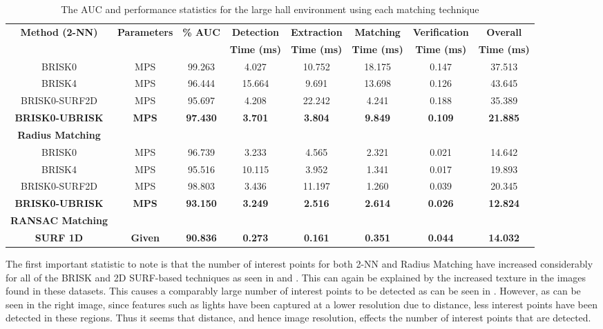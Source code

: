 \begin{table}
\centering
\caption{The AUC and performance statistics for the large hall environment
using each matching technique}

\footnotesize
\begin{tabular}{|c|c|c|c|c|c|c|c|}
\hline 
\textbf{Method (2-NN)} & \textbf{Parameters} & \textbf{\% AUC} & \textbf{Detection} & \textbf{Extraction} & \textbf{Matching} & \textbf{Verification} & \textbf{Overall}\tabularnewline
 &  &  & \textbf{Time (ms)} & \textbf{Time (ms)} & \textbf{Time (ms)} & \textbf{Time (ms)} & \textbf{Time (ms)}\tabularnewline
\hline 
\hline 
BRISK0 & MPS & 99.263 & 4.027 & 10.752 & 18.175 & 0.147 & 37.513\tabularnewline
\hline 
BRISK4 & MPS & 96.444 & 15.664 & 9.691 & 13.698 & 0.126 & 43.645\tabularnewline
\hline 
BRISK0-SURF2D & MPS & 95.697 & 4.208 & 22.242 & 4.241 & 0.188 & 35.389\tabularnewline
\hline 
\textbf{BRISK0-UBRISK} & \textbf{MPS} & \textbf{97.430} & \textbf{3.701} & \textbf{3.804} & \textbf{9.849} & \textbf{0.109} & \textbf{21.885}\tabularnewline
\hline 
\hline 
\textbf{Radius Matching} &  &  &  &  &  &  & \tabularnewline
\hline 
BRISK0 & MPS & 96.739 & 3.233 & 4.565 & 2.321 & 0.021 & 14.642\tabularnewline
\hline 
BRISK4 & MPS & 95.516 & 10.115 & 3.952 & 1.341 & 0.017 & 19.893\tabularnewline
\hline 
BRISK0-SURF2D & MPS & 98.803 & 3.436 & 11.197 & 1.260 & 0.039 & 20.345\tabularnewline
\hline 
\textbf{BRISK0-UBRISK} & \textbf{MPS} & \textbf{93.150} & \textbf{3.249} & \textbf{2.516} & \textbf{2.614} & \textbf{0.026} & \textbf{12.824}\tabularnewline
\hline 
\hline 
\textbf{RANSAC Matching} &  &  &  &  &  &  & \tabularnewline
\hline 
\textbf{SURF 1D} & \textbf{Given} & \textbf{90.836} & \textbf{0.273} & \textbf{0.161} & \textbf{0.351} & \textbf{0.044} & \textbf{14.032}\tabularnewline
\hline 
\end{tabular}
\label{tab:lh_times}
\end{table}

The first important statistic to note is that the number of interest points for both 2-NN and Radius Matching have increased considerably for all of the BRISK and 2D SURF-based techniques as seen in  and . This can again be explained by the increased texture in the images found in these datasets. This causes a comparably large number of interest points to be detected as can be seen in . However, as can be seen in the right image, since features such as lights have been captured at a lower resolution due to distance, less interest points have been detected in these regions. Thus it seems that distance, and hence image resolution, effects the number of interest points that are detected.\\

